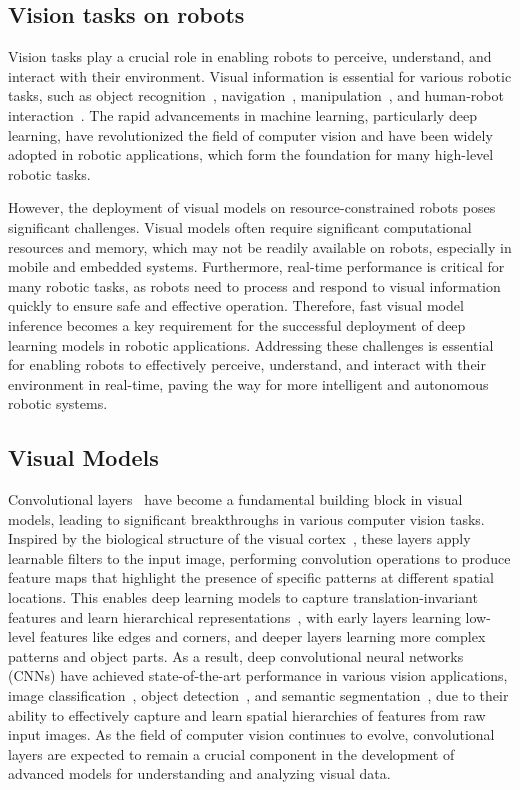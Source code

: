 \subsection{Vision tasks on robots}
Vision tasks play a crucial role in enabling robots to perceive, understand, and interact with their environment. 
Visual information is essential for various robotic tasks, such as object recognition~\cite{galvez2018object}, navigation~\cite{ran2017convolutional}, manipulation~\cite{bayar2018constrained}, and human-robot interaction~\cite{wu2019weight}. 
The rapid advancements in machine learning, particularly deep learning, have revolutionized the field of computer vision and have been widely adopted in robotic applications, which form the foundation for many high-level robotic tasks.

However, the deployment of visual models on resource-constrained robots poses significant challenges. 
Visual models often require significant computational resources and memory, which may not be readily available on robots, especially in mobile and embedded systems. 
Furthermore, real-time performance is critical for many robotic tasks, as robots need to process and respond to visual information quickly to ensure safe and effective operation. 
Therefore, fast visual model inference becomes a key requirement for the successful deployment of deep learning models in robotic applications.
Addressing these challenges is essential for enabling robots to effectively perceive, understand, and interact with their environment in real-time, paving the way for more intelligent and autonomous robotic systems.


\subsection{Visual Models}
Convolutional layers~\cite{o2015introduction} have become a fundamental building block in visual models, leading to significant breakthroughs in various computer vision tasks. 
Inspired by the biological structure of the visual cortex~\cite{tripp2019approximating}, these layers apply learnable filters to the input image, performing convolution operations to produce feature maps that highlight the presence of specific patterns at different spatial locations. 
This enables deep learning models to capture translation-invariant features and learn hierarchical representations~\cite{ma2015hierarchical}, with early layers learning low-level features like edges and corners, and deeper layers learning more complex patterns and object parts. 
As a result, deep convolutional neural networks (CNNs) have achieved state-of-the-art performance in various vision applications, image classification~\cite{rawat2017deep}, object detection~\cite{galvez2018object}, and semantic segmentation~\cite{wang2018understanding}, due to their ability to effectively capture and learn spatial hierarchies of features from raw input images. 
As the field of computer vision continues to evolve, convolutional layers are expected to remain a crucial component in the development of advanced models for understanding and analyzing visual data.

